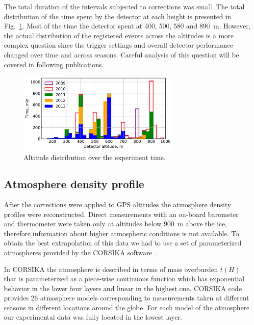 \documentclass[preprint,5p,times]{elsarticle}
\begin{document}
The total duration of the intervals subjected to corrections was small. The total distribution of the time spent by the detector at each height is presented in Fig.~\ref{fig:time_on_altitude}. Most of the time the detector spent at 400, 500, 580 and 890~m. However, the actual distribution of the registered events across the altitudes is a more complex question since the trigger settings and overall detector performance changed over time and across seasons. Careful analysis of this question will be covered in following publications.

\begin{figure}[t]
    \includegraphics[width=19pc]{time_on_altitude_c.pdf}%
    \caption{Altitude distribution over the experiment time.}
    \label{fig:time_on_altitude}
\end{figure}


\subsection{Atmosphere density profile}
\label{sect:atmosphere-profile}

After the corrections were applied to GPS altitudes the atmosphere density profiles were reconstructed. Direct measurements with an on-board barometer and thermometer were taken only at altitudes below 900~m above the ice, therefore information about higher atmospheric conditions is not available. To obtain the best extrapolation of this data we had to use a set of parameterized atmospheres provided by the CORSIKA software~\cite{hec98}.

In CORSIKA the atmosphere is described in terms of mass overburden $t(H)$ that is parameterized as a piece-wise continuous function which has exponential behavior in the lower four layers and linear in the highest one. CORSIKA code provides 26 atmosphere models corresponding to measurements taken at different seasons in different locations around the globe. For each model of the atmosphere our experimental data was fully located in the lowest layer.
\end{document}
